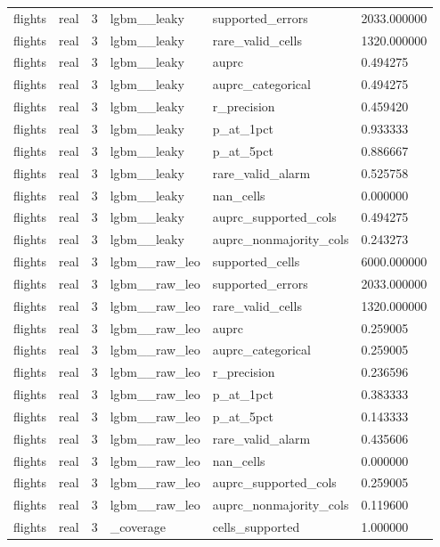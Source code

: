 \begin{tabular}{llllll}
flights & real & 3 & lgbm\_\_leaky & supported\_errors & 2033.000000 \\
flights & real & 3 & lgbm\_\_leaky & rare\_valid\_cells & 1320.000000 \\
flights & real & 3 & lgbm\_\_leaky & auprc & 0.494275 \\
flights & real & 3 & lgbm\_\_leaky & auprc\_categorical & 0.494275 \\
flights & real & 3 & lgbm\_\_leaky & r\_precision & 0.459420 \\
flights & real & 3 & lgbm\_\_leaky & p\_at\_1pct & 0.933333 \\
flights & real & 3 & lgbm\_\_leaky & p\_at\_5pct & 0.886667 \\
flights & real & 3 & lgbm\_\_leaky & rare\_valid\_alarm & 0.525758 \\
flights & real & 3 & lgbm\_\_leaky & nan\_cells & 0.000000 \\
flights & real & 3 & lgbm\_\_leaky & auprc\_supported\_cols & 0.494275 \\
flights & real & 3 & lgbm\_\_leaky & auprc\_nonmajority\_cols & 0.243273 \\
flights & real & 3 & lgbm\_\_raw\_leo & supported\_cells & 6000.000000 \\
flights & real & 3 & lgbm\_\_raw\_leo & supported\_errors & 2033.000000 \\
flights & real & 3 & lgbm\_\_raw\_leo & rare\_valid\_cells & 1320.000000 \\
flights & real & 3 & lgbm\_\_raw\_leo & auprc & 0.259005 \\
flights & real & 3 & lgbm\_\_raw\_leo & auprc\_categorical & 0.259005 \\
flights & real & 3 & lgbm\_\_raw\_leo & r\_precision & 0.236596 \\
flights & real & 3 & lgbm\_\_raw\_leo & p\_at\_1pct & 0.383333 \\
flights & real & 3 & lgbm\_\_raw\_leo & p\_at\_5pct & 0.143333 \\
flights & real & 3 & lgbm\_\_raw\_leo & rare\_valid\_alarm & 0.435606 \\
flights & real & 3 & lgbm\_\_raw\_leo & nan\_cells & 0.000000 \\
flights & real & 3 & lgbm\_\_raw\_leo & auprc\_supported\_cols & 0.259005 \\
flights & real & 3 & lgbm\_\_raw\_leo & auprc\_nonmajority\_cols & 0.119600 \\
flights & real & 3 & \_coverage & cells\_supported & 1.000000 \\

\end{tabular}
